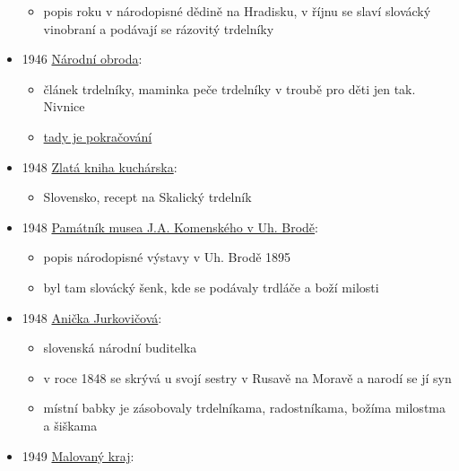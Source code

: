\begin{itemize}
  \begin{itemize}
  \tightlist
  \item
    popis roku v národopisné dědině na Hradisku, v říjnu se slaví
    slovácký vinobraní a podávají se rázovitý trdelníky
  \end{itemize}
\item
  1946
  \href{https://ceskadigitalniknihovna.cz/uuid/uuid:4b7ffab0-68c3-11e8-a583-005056827e51}{Národní
  obroda}:

  \begin{itemize}
  \tightlist
  \item
    článek trdelníky, maminka peče trdelníky v troubě pro děti jen tak.
    Nivnice
  \item
    \href{https://ceskadigitalniknihovna.cz/uuid/uuid:747b7700-68c3-11e8-943b-5ef3fc9ae867}{tady
    je pokračování}
  \end{itemize}
\item
  1948
  \href{https://dikda.snk.sk/uuid/uuid:92a95dfe-83fe-44e4-9c0a-5c7cec70c80c}{Zlatá
  kniha kuchárska}:

  \begin{itemize}
  \tightlist
  \item
    Slovensko, recept na Skalický trdelník
  \end{itemize}
\item
  1948
  \href{https://ceskadigitalniknihovna.cz/uuid/uuid:1536d800-488a-11e4-aded-005056827e51}{Památník
  musea J.A. Komenského v Uh. Brodě}:

  \begin{itemize}
  \tightlist
  \item
    popis národopisné výstavy v Uh. Brodě 1895
  \item
    byl tam slovácký šenk, kde se podávaly trdláče a boží milosti
  \end{itemize}
\item
  1948
  \href{https://dikda.snk.sk/uuid/uuid:fe08d509-63e7-4e4f-bf4f-0d9cef56b5a8}{Anička
  Jurkovičová}:

  \begin{itemize}
  \tightlist
  \item
    slovenská národní buditelka
  \item
    v roce 1848 se skrývá u svojí sestry v Rusavě na Moravě a narodí se
    jí syn
  \item
    místní babky je zásobovaly trdelníkama, radostníkama, božíma
    milostma a šiškama
  \end{itemize}
\item
  1949
  \href{https://ceskadigitalniknihovna.cz/uuid/uuid:66097490-f209-11e3-a012-005056825209}{Malovaný
  kraj}:


\end{itemize}
